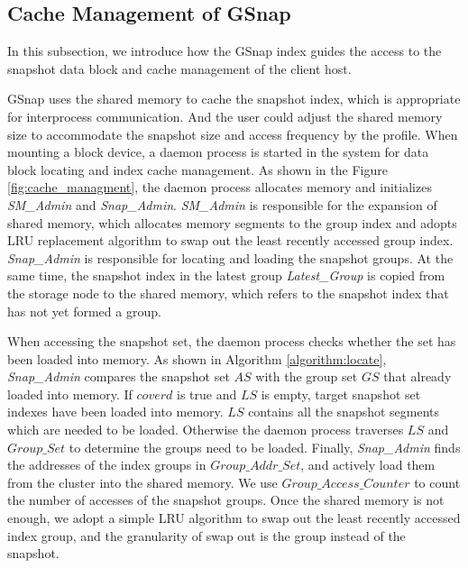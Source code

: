 \documentclass[sigconf, nonacm]{acmart}
\begin{document}
\subsection{Cache Management of GSnap}
In this subsection, we introduce how the GSnap index guides the access to the snapshot data block and cache management of the client host.

GSnap uses the shared memory to cache the snapshot index, which is appropriate for interprocess communication. And the user could adjust the shared memory size to accommodate the snapshot size and access frequency by the profile.
When mounting a block device, a daemon process is started in the system for data block locating and index cache management.
As shown in the Figure \ref{fig:cache_managment}, the daemon process allocates memory and initializes \emph{SM\_Admin} and \emph{Snap\_Admin}. \emph{SM\_Admin} is responsible for the expansion of shared memory, which allocates memory segments to the group index and adopts LRU replacement algorithm to swap out the least recently accessed group index. \emph{Snap\_Admin} is responsible for locating and loading the snapshot groups.
At the same time, the snapshot index in the latest group \emph{Latest\_Group} is copied from the storage node to the shared memory, which refers to the snapshot index that has not yet formed a group.

When accessing the snapshot set, the daemon process checks whether the set has been loaded into memory. As shown in Algorithm \ref{algorithm:locate}, \emph{Snap\_Admin} compares the snapshot set $AS$ with the group set $GS$ that already loaded into memory.
If $coverd$ is true and $LS$ is empty, target snapshot set indexes have been loaded into memory. $LS$ contains all the snapshot segments which are needed to be loaded.
Otherwise the daemon process traverses $LS$ and $Group\_Set$ to determine the groups need to be loaded. Finally, \emph{Snap\_Admin} finds the addresses of the index groups in $Group\_Addr\_Set$, and actively load them from the cluster into the shared memory.
We use $Group\_Access\_Counter$ to count the number of accesses of the snapshot groups. Once the shared memory is not enough, we adopt a simple LRU algorithm to swap out the least recently accessed index group, and the granularity of swap out is the group instead of the snapshot.
\end{document}
